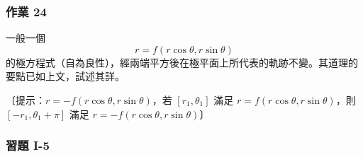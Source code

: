\subsubsection*{作業 24}
一般一個
\[
  r = f(r\cos\theta, r\sin\theta)
\]
的極方程式（自為良性），經兩端平方後在極平面上所代表的軌跡不變。其道理的要點已如上文，試述其詳。

〔提示：$r = -f(r\cos\theta, r\sin\theta)$，若 $[r_1, \theta_1]$ 滿足 $r = f(r\cos\theta, r\sin\theta)$，則 $[-r_1, \theta_1 + \pi]$ 滿足 $r = -f(r\cos\theta, r\sin\theta)$〕

\subsubsection*{習題 I-5}
\label{sec:b5-ex1-5}

